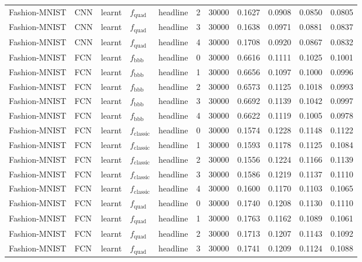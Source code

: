 {\begin{longtable}[]{@{}lllllr r r r r r@{}}
Fashion-MNIST & CNN & learnt & $f_{\text{quad}}$ & headline & 2 & 30000 & 0.1627 & 0.0908 & 0.0850 & 0.0805 \\
Fashion-MNIST & CNN & learnt & $f_{\text{quad}}$ & headline & 3 & 30000 & 0.1638 & 0.0971 & 0.0881 & 0.0837 \\
Fashion-MNIST & CNN & learnt & $f_{\text{quad}}$ & headline & 4 & 30000 & 0.1708 & 0.0920 & 0.0867 & 0.0832 \\
\addlinespace[2pt]
Fashion-MNIST & FCN & learnt & $f_{\text{bbb}}$ & headline & 0 & 30000 & 0.6616 & 0.1111 & 0.1025 & 0.1001 \\
Fashion-MNIST & FCN & learnt & $f_{\text{bbb}}$ & headline & 1 & 30000 & 0.6656 & 0.1097 & 0.1000 & 0.0996 \\
Fashion-MNIST & FCN & learnt & $f_{\text{bbb}}$ & headline & 2 & 30000 & 0.6573 & 0.1125 & 0.1018 & 0.0993 \\
Fashion-MNIST & FCN & learnt & $f_{\text{bbb}}$ & headline & 3 & 30000 & 0.6692 & 0.1139 & 0.1042 & 0.0997 \\
Fashion-MNIST & FCN & learnt & $f_{\text{bbb}}$ & headline & 4 & 30000 & 0.6622 & 0.1119 & 0.1005 & 0.0978 \\
\addlinespace[2pt]
Fashion-MNIST & FCN & learnt & $f_{\text{classic}}$ & headline & 0 & 30000 & 0.1574 & 0.1228 & 0.1148 & 0.1122 \\
Fashion-MNIST & FCN & learnt & $f_{\text{classic}}$ & headline & 1 & 30000 & 0.1593 & 0.1178 & 0.1125 & 0.1084 \\
Fashion-MNIST & FCN & learnt & $f_{\text{classic}}$ & headline & 2 & 30000 & 0.1556 & 0.1224 & 0.1166 & 0.1139 \\
Fashion-MNIST & FCN & learnt & $f_{\text{classic}}$ & headline & 3 & 30000 & 0.1586 & 0.1219 & 0.1137 & 0.1110 \\
Fashion-MNIST & FCN & learnt & $f_{\text{classic}}$ & headline & 4 & 30000 & 0.1600 & 0.1170 & 0.1103 & 0.1065 \\
\addlinespace[2pt]
Fashion-MNIST & FCN & learnt & $f_{\text{quad}}$ & headline & 0 & 30000 & 0.1740 & 0.1208 & 0.1130 & 0.1110 \\
Fashion-MNIST & FCN & learnt & $f_{\text{quad}}$ & headline & 1 & 30000 & 0.1763 & 0.1162 & 0.1089 & 0.1061 \\
Fashion-MNIST & FCN & learnt & $f_{\text{quad}}$ & headline & 2 & 30000 & 0.1713 & 0.1207 & 0.1143 & 0.1092 \\
Fashion-MNIST & FCN & learnt & $f_{\text{quad}}$ & headline & 3 & 30000 & 0.1741 & 0.1209 & 0.1124 & 0.1088 \\

\end{longtable}}
